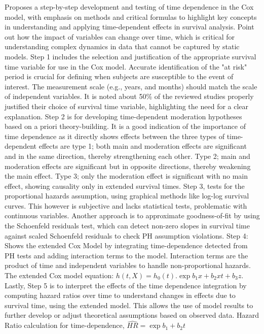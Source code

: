 \noindent \parencite{woo_time_2023} Proposes a step-by-step development and testing of time dependence in the Cox model, with emphasis on methods and critical formulas to highlight key concepts in understanding and applying time-dependent effects in survival analysis. \parencite{woo_time_2023} Point out how the impact of variables can change over time, which is critical for understanding complex dynamics in data that cannot be captured by static models. Step 1 includes the selection and justification of the appropriate survival time variable for use in the Cox model. Accurate identification of the "at risk" period is crucial for defining when subjects are susceptible to the event of interest. The measurement scale (e.g., years, and months) should match the scale of independent variables. It is noted about 50\% of the reviewed studies properly justified their choice of survival time variable, highlighting the need for a clear explanation. Step 2 is for developing time-dependent moderation hypotheses based on a priori theory-building. It is a good indication of the importance of time dependence as it directly shows effects between \parencite{woo_time_2023} the three types of time-dependent effects are type 1; both main and moderation effects are significant and in the same direction, thereby strengthening each other. Type 2; main and moderation effects are significant but in opposite directions, thereby weakening the main effect. Type 3; only the moderation effect is significant with no main effect, showing causality only in extended survival times. Step 3, tests for the proportional hazards assumption, using graphical methods like log-log survival curves. \parencite{woo_time_2023} This however is subjective and lacks statistical tests, problematic with continuous variables. Another approach is to approximate goodness-of-fit by using the Schoenfeld residuals test, which can detect non-zero slopes in survival time against scaled Schoenfeld residuals to check PH assumption violations. Step 4: Shows the extended Cox Model by integrating time-dependence detected from PH tests and adding interaction terms to the model. Interaction terms are the product of time and independent variables to handle non-proportional hazards. The extended Cox model equation: \(h(t,X) = h_{0}(t).\exp{b_{1}x+b_{2}xt+b_{3}z}\). Lastly, Step 5 is to interpret the effects of the time dependence integration by computing hazard ratios over time to understand changes in effects due to survival time, using the extended model. \parencite{woo_time_2023} This allows the use of model results to further develop or adjust theoretical assumptions based on observed data. Hazard Ratio calculation for time-dependence, \(\hat{HR} = \exp{b_{1}+b_{2}t}\)
